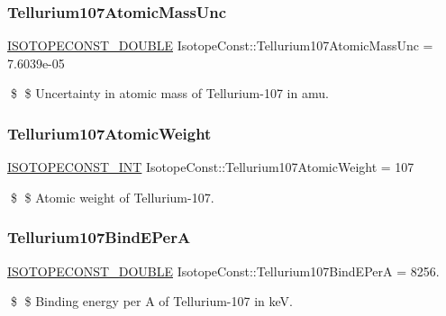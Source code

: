 \subsubsection{\texorpdfstring{Tellurium107\+Atomic\+Mass\+Unc}{Tellurium107AtomicMassUnc}}
{\footnotesize\ttfamily \mbox{\hyperlink{group___isotope_const-_macros_ga8f45a7272ce02c0b4c65c44636ed719a}{I\+S\+O\+T\+O\+P\+E\+C\+O\+N\+S\+T\+\_\+\+D\+O\+U\+B\+LE}} Isotope\+Const\+::\+Tellurium107\+Atomic\+Mass\+Unc = 7.\+6039e-\/05}

\$ \$ Uncertainty in atomic mass of Tellurium-\/107 in amu. \mbox{\label{group___isotope_const-_tellurium-_te107_ga2388df27b235f9f57e02e3e147811fb4}} 
\subsubsection{\texorpdfstring{Tellurium107\+Atomic\+Weight}{Tellurium107AtomicWeight}}
{\footnotesize\ttfamily \mbox{\hyperlink{group___isotope_const-_macros_ga5f18360b3e99483a35c32d789e62621c}{I\+S\+O\+T\+O\+P\+E\+C\+O\+N\+S\+T\+\_\+\+I\+NT}} Isotope\+Const\+::\+Tellurium107\+Atomic\+Weight = 107}

\$ \$ Atomic weight of Tellurium-\/107. \mbox{\label{group___isotope_const-_tellurium-_te107_ga1a9a3da8ab664d6151cb5ad56ecf7d0b}} 
\subsubsection{\texorpdfstring{Tellurium107\+Bind\+E\+PerA}{Tellurium107BindEPerA}}
{\footnotesize\ttfamily \mbox{\hyperlink{group___isotope_const-_macros_ga8f45a7272ce02c0b4c65c44636ed719a}{I\+S\+O\+T\+O\+P\+E\+C\+O\+N\+S\+T\+\_\+\+D\+O\+U\+B\+LE}} Isotope\+Const\+::\+Tellurium107\+Bind\+E\+PerA = 8256.}

\$ \$ Binding energy per A of Tellurium-\/107 in keV. \mbox{\label{group___isotope_const-_tellurium-_te107_gadaf22180a53078d90e091dcdac88d6c8}} 
